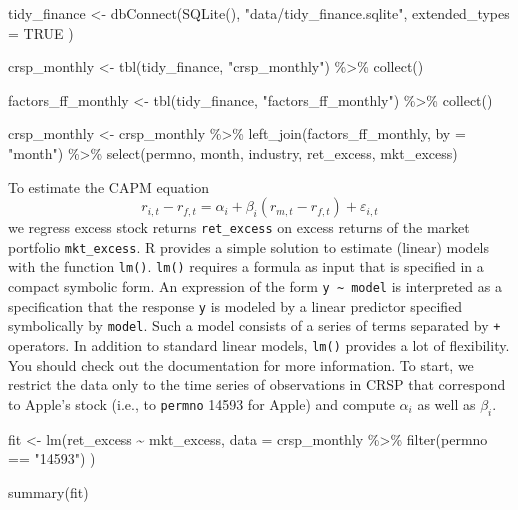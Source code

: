 \documentclass[
]{krantz}
\newenvironment{Shaded}{\begin{snugshade}}{\end{snugshade}}
\newcommand{\AttributeTok}[1]{\textcolor[rgb]{0.61,0.61,0.61}{#1}}
\newcommand{\ConstantTok}[1]{\textcolor[rgb]{0,0,0}{#1}}
\newcommand{\FunctionTok}[1]{\textcolor[rgb]{0,0,0}{#1}}
\newcommand{\NormalTok}[1]{#1}
\newcommand{\OtherTok}[1]{\textcolor[rgb]{0.37,0.37,0.37}{#1}}
\newcommand{\SpecialCharTok}[1]{\textcolor[rgb]{0,0,0}{#1}}
\newcommand{\StringTok}[1]{\textcolor[rgb]{0.5,0.5,0.5}{#1}}
\begin{document}
\begin{Shaded}
\begin{Highlighting}[]
\NormalTok{tidy\_finance }\OtherTok{\textless{}{-}} \FunctionTok{dbConnect}\NormalTok{(}\FunctionTok{SQLite}\NormalTok{(), }\StringTok{"data/tidy\_finance.sqlite"}\NormalTok{,}
  \AttributeTok{extended\_types =} \ConstantTok{TRUE}
\NormalTok{)}

\NormalTok{crsp\_monthly }\OtherTok{\textless{}{-}} \FunctionTok{tbl}\NormalTok{(tidy\_finance, }\StringTok{"crsp\_monthly"}\NormalTok{) }\SpecialCharTok{\%\textgreater{}\%}
  \FunctionTok{collect}\NormalTok{()}

\NormalTok{factors\_ff\_monthly }\OtherTok{\textless{}{-}} \FunctionTok{tbl}\NormalTok{(tidy\_finance, }\StringTok{"factors\_ff\_monthly"}\NormalTok{) }\SpecialCharTok{\%\textgreater{}\%}
  \FunctionTok{collect}\NormalTok{()}

\NormalTok{crsp\_monthly }\OtherTok{\textless{}{-}}\NormalTok{ crsp\_monthly }\SpecialCharTok{\%\textgreater{}\%}
  \FunctionTok{left\_join}\NormalTok{(factors\_ff\_monthly, }\AttributeTok{by =} \StringTok{"month"}\NormalTok{) }\SpecialCharTok{\%\textgreater{}\%}
  \FunctionTok{select}\NormalTok{(permno, month, industry, ret\_excess, mkt\_excess)}
\end{Highlighting}
\end{Shaded}

To estimate the CAPM equation
\[
r_{i, t} - r_{f, t} = \alpha_i + \beta_i(r_{m, t}-r_{f,t})+\varepsilon_{i, t}
\]
we regress excess stock returns \texttt{ret\_excess} on excess returns of the market portfolio \texttt{mkt\_excess}.
R provides a simple solution to estimate (linear) models with the function \texttt{lm()}. \texttt{lm()} requires a formula as input that is specified in a compact symbolic form. An expression of the form \texttt{y\ \textasciitilde{}\ model} is interpreted as a specification that the response \texttt{y} is modeled by a linear predictor specified symbolically by \texttt{model}. Such a model consists of a series of terms separated by \texttt{+} operators. In addition to standard linear models, \texttt{lm()} provides a lot of flexibility. You should check out the documentation for more information. To start, we restrict the data only to the time series of observations in CRSP that correspond to Apple's stock (i.e., to \texttt{permno} 14593 for Apple) and compute \(\alpha_i\) as well as \(\beta_i\).

\begin{Shaded}
\begin{Highlighting}[]
\NormalTok{fit }\OtherTok{\textless{}{-}} \FunctionTok{lm}\NormalTok{(ret\_excess }\SpecialCharTok{\textasciitilde{}}\NormalTok{ mkt\_excess,}
  \AttributeTok{data =}\NormalTok{ crsp\_monthly }\SpecialCharTok{\%\textgreater{}\%}
    \FunctionTok{filter}\NormalTok{(permno }\SpecialCharTok{==} \StringTok{"14593"}\NormalTok{)}
\NormalTok{)}

\FunctionTok{summary}\NormalTok{(fit)}
\end{Highlighting}
\end{Shaded}
\end{document}

